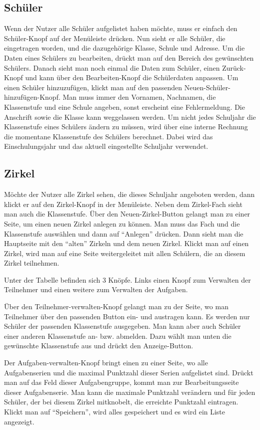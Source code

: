 \subsection{Schüler}
Wenn der Nutzer alle Schüler aufgelistet haben möchte, muss er einfach den Schüler-Knopf auf der Menüleiste drücken. Nun sieht er alle Schüler, die eingetragen worden, und die dazugehörige Klasse, Schule und Adresse. Um die Daten eines Schülers zu bearbeiten, drückt man auf den Bereich des gewünschten Schülers. Danach sieht man noch einmal die Daten zum Schüler, einen Zurück-Knopf und kann über den Bearbeiten-Knopf die Schülerdaten anpassen. Um einen Schüler hinzuzufügen, klickt man auf den passenden Neuen-Schüler-hinzufügen-Knopf. Man muss immer den Vornamen, Nachnamen, die Klassenstufe und eine Schule angeben, sonst erscheint eine Fehlermeldung. Die Anschrift sowie die Klasse kann weggelassen werden. Um nicht jedes Schuljahr die Klassenstufe eines Schülers ändern zu müssen, wird über eine interne Rechnung die momentane Klassenstufe des Schülers berechnet. Dabei wird das Einschulungsjahr und das aktuell eingestellte Schuljahr verwendet.

\subsection{Zirkel}
Möchte der Nutzer alle Zirkel sehen, die dieses Schuljahr angeboten werden, dann klickt er auf den Zirkel-Knopf in der Menüleiste. Neben dem Zirkel-Fach sieht man auch die Klassenstufe. Über den Neuen-Zirkel-Button gelangt man zu einer Seite, um einen neuen Zirkel anlegen zu können. Man muss das Fach und die Klassenstufe auswählen und dann auf "`Anlegen"' drücken. Dann sieht man die Hauptseite mit den "`alten"' Zirkeln und dem neuen Zirkel. Klickt man auf einen Zirkel, wird man auf eine Seite weitergeleitet mit allen Schülern, die an diesem Zirkel teilnehmen. 

Unter der Tabelle befinden sich 3 Knöpfe. Links einen Knopf zum Verwalten der Teilnehmer und einen weitere zum Verwalten der Aufgaben. 

Über den Teilnehmer-verwalten-Knopf gelangt man zu der Seite, wo man Teilnehmer über den passenden Button ein- und austragen kann. Es werden nur Schüler der passenden Klassenstufe ausgegeben. Man kann aber auch Schüler einer anderen Klassenstufe an- bzw. abmelden. Dazu wählt man unten die gewünschte Klassenstufe aus und drückt den Anzeige-Button. 

Der Aufgaben-verwalten-Knopf bringt einen zu einer Seite, wo alle Aufgabenserien und die maximal Punktzahl dieser Serien aufgelistet sind. Drückt man auf das Feld dieser Aufgabengruppe, kommt man zur Bearbeitungsseite dieser Aufgabenserie. Man kann die maximale Punktzahl verändern und für jeden Schüler, der bei diesem Zirkel mitknobelt, die erreichte Punktzahl eintragen. Klickt man auf "`Speichern"', wird alles gespeichert und es wird ein Liste angezeigt. 


